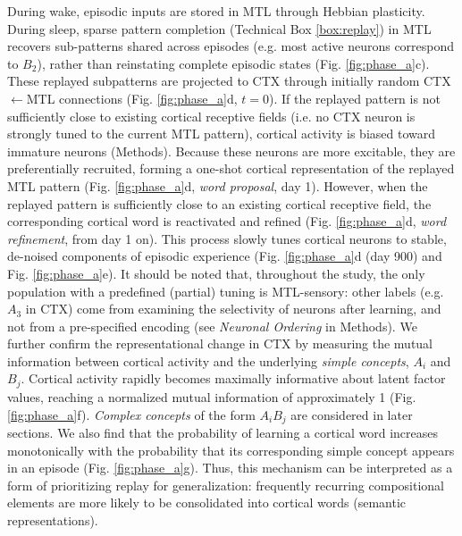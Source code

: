 \documentclass{article}
\begin{document}
During wake, episodic inputs are stored in MTL through Hebbian plasticity. During sleep, sparse pattern completion (Technical Box \ref{box:replay}) in MTL recovers sub-patterns shared across episodes (e.g. most active neurons correspond to $B_2$), rather than reinstating complete episodic states (Fig. \ref{fig:phase_a}c). These replayed subpatterns are projected to CTX through initially random CTX$\leftarrow$MTL connections (Fig. \ref{fig:phase_a}d, $t=0$). If the replayed pattern is not sufficiently close to existing cortical receptive fields (i.e. no CTX neuron is strongly tuned to the current MTL pattern), cortical activity is biased toward immature neurons (Methods). Because these neurons are more excitable, they are preferentially recruited, forming a one-shot cortical representation of the replayed MTL pattern (Fig. \ref{fig:phase_a}d, \textit{word proposal}, day 1). However, when the replayed pattern is sufficiently close to an existing cortical receptive field, the corresponding cortical word is reactivated and refined (Fig. \ref{fig:phase_a}d, \textit{word refinement}, from day 1 on). This process slowly tunes cortical neurons to stable, de-noised components of episodic experience (Fig. \ref{fig:phase_a}d (day 900) and Fig. \ref{fig:phase_a}e). It should be noted that, throughout the study, the only population with a predefined (partial) tuning is MTL-sensory: other labels (e.g. $A_3$ in CTX) come from examining the selectivity of neurons after learning, and not from a pre-specified encoding (see \textit{Neuronal Ordering} in Methods).
\newline\newline
We further confirm the representational change in CTX by measuring the mutual information between cortical activity and the underlying \textit{simple concepts}, $A_i$ and $B_j$. Cortical activity rapidly becomes maximally informative about latent factor values, reaching a normalized mutual information of approximately 1 (Fig. \ref{fig:phase_a}f). \textit{Complex concepts} of the form $A_iB_j$ are considered in later sections. We also find that the probability of learning a cortical word increases monotonically with the probability that its corresponding simple concept appears in an episode (Fig. \ref{fig:phase_a}g). Thus, this mechanism can be interpreted as a form of prioritizing replay for generalization: frequently recurring compositional elements are more likely to be consolidated into cortical words (semantic representations).
\end{document}
